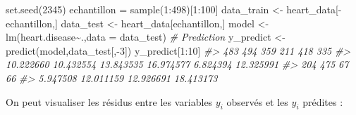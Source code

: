\documentclass[
]{book}
\newenvironment{Shaded}{\begin{snugshade}}{\end{snugshade}}
\newcommand{\AttributeTok}[1]{\textcolor[rgb]{0.77,0.63,0.00}{#1}}
\newcommand{\CommentTok}[1]{\textcolor[rgb]{0.56,0.35,0.01}{\textit{#1}}}
\newcommand{\DecValTok}[1]{\textcolor[rgb]{0.00,0.00,0.81}{#1}}
\newcommand{\FunctionTok}[1]{\textcolor[rgb]{0.00,0.00,0.00}{#1}}
\newcommand{\NormalTok}[1]{#1}
\newcommand{\OtherTok}[1]{\textcolor[rgb]{0.56,0.35,0.01}{#1}}
\newcommand{\SpecialCharTok}[1]{\textcolor[rgb]{0.00,0.00,0.00}{#1}}
\newcommand{\StringTok}[1]{\textcolor[rgb]{0.31,0.60,0.02}{#1}}
\begin{document}
\begin{Shaded}
\begin{Highlighting}[]
\FunctionTok{set.seed}\NormalTok{(}\DecValTok{2345}\NormalTok{)}
\NormalTok{echantillon }\OtherTok{=} \FunctionTok{sample}\NormalTok{(}\DecValTok{1}\SpecialCharTok{:}\DecValTok{498}\NormalTok{)[}\DecValTok{1}\SpecialCharTok{:}\DecValTok{100}\NormalTok{]}
\NormalTok{data\_train }\OtherTok{\textless{}{-}}\NormalTok{ heart\_data[}\SpecialCharTok{{-}}\NormalTok{echantillon,]}
\NormalTok{data\_test }\OtherTok{\textless{}{-}}\NormalTok{ heart\_data[echantillon,]}
\NormalTok{model }\OtherTok{\textless{}{-}} \FunctionTok{lm}\NormalTok{(heart.disease}\SpecialCharTok{\textasciitilde{}}\NormalTok{.,}\AttributeTok{data =}\NormalTok{ data\_test)}
\CommentTok{\# Prediction}
\NormalTok{y\_predict }\OtherTok{\textless{}{-}} \FunctionTok{predict}\NormalTok{(model,data\_test[,}\SpecialCharTok{{-}}\DecValTok{3}\NormalTok{])}
\NormalTok{y\_predict[}\DecValTok{1}\SpecialCharTok{:}\DecValTok{10}\NormalTok{]}
\CommentTok{\#\textgreater{}       483       494       359       211       418       335 }
\CommentTok{\#\textgreater{} 10.222660 10.432554 13.843535 16.974577  6.824394 12.325991 }
\CommentTok{\#\textgreater{}       204       475        67        66 }
\CommentTok{\#\textgreater{}  5.947508 12.011159 12.926691 18.413173}
\end{Highlighting}
\end{Shaded}

On peut visualiser les résidus entre les variables \(y_i\) observés et les \(y_i\) prédites :

\begin{Shaded}
\end{Shaded}
\end{document}
